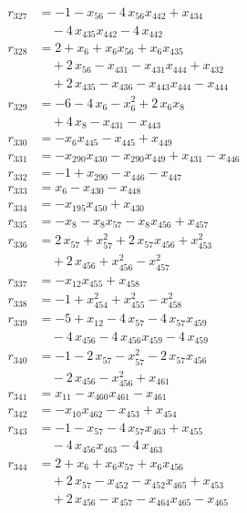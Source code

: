 \begin{align*}
r_{327} &= -1 - x_{56} - 4\,x_{56} x_{442} + x_{434} \\
&\quad{}- 4\,x_{435} x_{442} - 4\,x_{442} \\
r_{328} &= 2 + x_{6} + x_{6} x_{56} + x_{6} x_{435} \\
&\quad{}+ 2\,x_{56} - x_{431} - x_{431} x_{444} + x_{432} \\
&\quad{}+ 2\,x_{435} - x_{436} - x_{443} x_{444} - x_{444} \\
r_{329} &= -6 - 4\,x_{6} - x_{6}^{2} + 2\,x_{6} x_{8} \\
&\quad{}+ 4\,x_{8} - x_{431} - x_{443} \\
r_{330} &= -x_{6} x_{445} - x_{445} + x_{449} \\
r_{331} &= -x_{290} x_{430} - x_{290} x_{449} + x_{431} - x_{446} \\
r_{332} &= -1 + x_{290} - x_{446} - x_{447} \\
r_{333} &= x_{6} - x_{430} - x_{448} \\
r_{334} &= -x_{195} x_{450} + x_{430} \\
r_{335} &= -x_{8} - x_{8} x_{57} - x_{8} x_{456} + x_{457} \\
r_{336} &= 2\,x_{57} + x_{57}^{2} + 2\,x_{57} x_{456} + x_{453}^{2} \\
&\quad{}+ 2\,x_{456} + x_{456}^{2} - x_{457}^{2} \\
r_{337} &= -x_{12} x_{455} + x_{458} \\
r_{338} &= -1 + x_{454}^{2} + x_{455}^{2} - x_{458}^{2} \\
r_{339} &= -5 + x_{12} - 4\,x_{57} - 4\,x_{57} x_{459} \\
&\quad{}- 4\,x_{456} - 4\,x_{456} x_{459} - 4\,x_{459} \\
r_{340} &= -1 - 2\,x_{57} - x_{57}^{2} - 2\,x_{57} x_{456} \\
&\quad{}- 2\,x_{456} - x_{456}^{2} + x_{461} \\
r_{341} &= x_{11} - x_{460} x_{461} - x_{461} \\
r_{342} &= -x_{10} x_{462} - x_{453} + x_{454} \\
r_{343} &= -1 - x_{57} - 4\,x_{57} x_{463} + x_{455} \\
&\quad{}- 4\,x_{456} x_{463} - 4\,x_{463} \\
r_{344} &= 2 + x_{6} + x_{6} x_{57} + x_{6} x_{456} \\
&\quad{}+ 2\,x_{57} - x_{452} - x_{452} x_{465} + x_{453} \\
&\quad{}+ 2\,x_{456} - x_{457} - x_{464} x_{465} - x_{465} \\

\end{align*}
